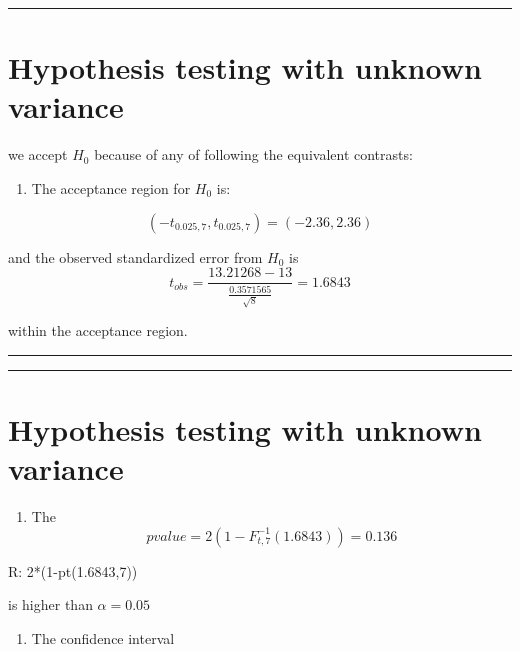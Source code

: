 \documentclass[
]{book}
\providecommand{\tightlist}{%
  \setlength{\itemsep}{0pt}\setlength{\parskip}{0pt}}
\begin{document}
\begin{center}\rule{0.5\linewidth}{0.5pt}\end{center}

\hypertarget{hypothesis-testing-with-unknown-variance}{%
\section{Hypothesis testing with unknown variance}\label{hypothesis-testing-with-unknown-variance}}

we accept \(H_0\) because of any of following the equivalent contrasts:

\begin{enumerate}
\def\labelenumi{\arabic{enumi}.}
\tightlist
\item
  The acceptance region for \(H_0\) is:
\end{enumerate}

\[(-t_{0.025,7}, t_{0.025,7})=( -2.36,  2.36)\]

and the observed standardized error from \(H_0\) is
\[t_{obs} =  \frac{13.21268-13}{\frac{0.3571565}{\sqrt{8}}}=1.6843\]

within the acceptance region.

\begin{center}\rule{0.5\linewidth}{0.5pt}\end{center}

\begin{center}\rule{0.5\linewidth}{0.5pt}\end{center}

\hypertarget{hypothesis-testing-with-unknown-variance-1}{%
\section{Hypothesis testing with unknown variance}\label{hypothesis-testing-with-unknown-variance-1}}

\begin{enumerate}
\def\labelenumi{\arabic{enumi}.}
\setcounter{enumi}{1}
\tightlist
\item
  The \[pvalue=2(1-F^{-1}_{t,7}(1.6843))=0.136\]
\end{enumerate}

R: 2*(1-pt(1.6843,7))

is higher than \(\alpha=0.05\)

\begin{enumerate}
\def\labelenumi{\arabic{enumi}.}
\setcounter{enumi}{2}
\tightlist
\item
  The confidence interval
\end{enumerate}
\end{document}
